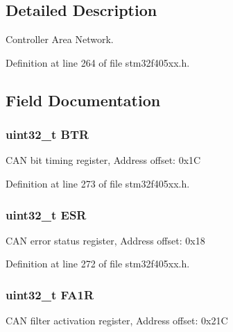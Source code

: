 \subsection{Detailed Description}
Controller Area Network. 

Definition at line 264 of file stm32f405xx.\+h.



\subsection{Field Documentation}
\subsubsection[{\texorpdfstring{B\+TR}{BTR}}]{ uint32\+\_\+t B\+TR}\hypertarget{struct_c_a_n___type_def_a5c0fcd3e7b4c59ab1dd68f6bd8f74e07}{}\label{struct_c_a_n___type_def_a5c0fcd3e7b4c59ab1dd68f6bd8f74e07}
C\+AN bit timing register, Address offset\+: 0x1C 

Definition at line 273 of file stm32f405xx.\+h.

\subsubsection[{\texorpdfstring{E\+SR}{ESR}}]{ uint32\+\_\+t E\+SR}\hypertarget{struct_c_a_n___type_def_a2b39f943954e0e7d177b511d9074a0b7}{}\label{struct_c_a_n___type_def_a2b39f943954e0e7d177b511d9074a0b7}
C\+AN error status register, Address offset\+: 0x18 

Definition at line 272 of file stm32f405xx.\+h.

\subsubsection[{\texorpdfstring{F\+A1R}{FA1R}}]{ uint32\+\_\+t F\+A1R}\hypertarget{struct_c_a_n___type_def_aaf76271f4ab0b3deb3ceb6e2ac0d62d0}{}\label{struct_c_a_n___type_def_aaf76271f4ab0b3deb3ceb6e2ac0d62d0}
C\+AN filter activation register, Address offset\+: 0x21C 

